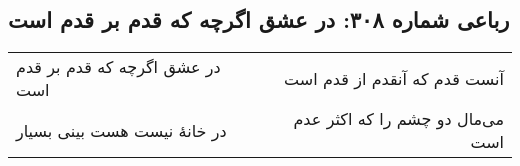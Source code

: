 \begin{center}
\section*{رباعی شماره ۳۰۸: در عشق اگرچه که قدم بر قدم است}
\label{sec:0308}
\begin{longtable}{l p{0.5cm} r}
در عشق اگرچه که قدم بر قدم است
&&
آنست قدم که آنقدم از قدم است
\\
در خانهٔ نیست هست بینی بسیار
&&
می‌مال دو چشم را که اکثر عدم است
\\
\end{longtable}
\end{center}
